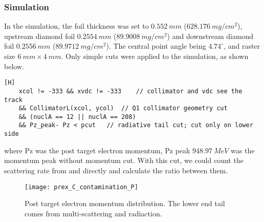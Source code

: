 \subsubsection{Simulation}
In the simulation, the \Pb foil thickness was set to $0.552\ mm$ ($628.176\ mg/cm^2$), 
upstream diamond foil $0.2554\ mm$ ($89.9008\ mg/cm^2$) and downstream diamond 
foil $0.2556\ mm$ ($89.9712\ mg/cm^2$). The central point angle being $4.74^\circ$,
and raster size $6\ mm \times 4\ mm$. 
Only simple cuts were applied to the simulation, as shown below.

\begin{lstlisting}[float,style=C][H]
    xcol != -333 && xvdc != -333    // collimator and vdc see the track
    && CollimatorL(xcol, ycol)	// Q1 collimator geometry cut
    && (nuclA == 12 || nuclA == 208)
    && Pz_peak- Pz < pcut	// radiative tail cut; cut only on lower side
\end{lstlisting}
where Pz was the post target electron momentum, Pz peak $948.97\ MeV$ 
was the momentum peak without momentum cut. With this cut, we could count the scattering
rate from \C and \Pb directly and calculate the ratio between them.

\begin{figure}[H]
    \centering
    \texttt{[image: prex\_C\_contamination\_P]}
    \caption{Post target electron momentum distribution. The lower end tail comes 
    from multi-scattering and radiaction.}
\end{figure}

